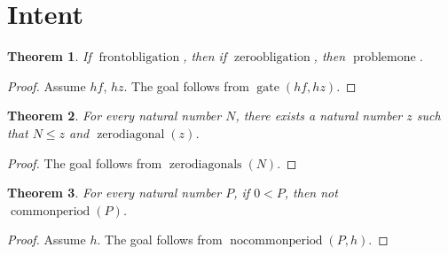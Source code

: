 \documentclass[11pt]{article}
\newtheorem{theorem}{Theorem}[section]
\theoremstyle{definition}
\begin{document}
\section{Intent}
\label{ll:paper:intent}
\begin{theorem}
\label{ll:paper:gate-theorem}
If \(\operatorname{frontobligation}\), then if \(\operatorname{zeroobligation}\), then \(\operatorname{problemone}\).
\end{theorem}
\begin{proof}
Assume \(hf\), \(hz\).
The goal follows from \(\operatorname{gate}(hf, hz)\).
\end{proof}
\begin{theorem}
\label{ll:paper:recompile-points}
For every natural number \(N\), there exists a natural number \(z\) such that \(N \le z\) and \(\operatorname{zerodiagonal}(z)\).
\end{theorem}
\begin{proof}
The goal follows from \(\operatorname{zerodiagonals}(N)\).
\end{proof}
\begin{theorem}
\label{ll:paper:unbounded-periods}
For every natural number \(P\), if \(0 < P\), then not \(\operatorname{commonperiod}(P)\).
\end{theorem}
\begin{proof}
Assume \(h\).
The goal follows from \(\operatorname{nocommonperiod}(P, h)\).
\end{proof}
\end{document}
